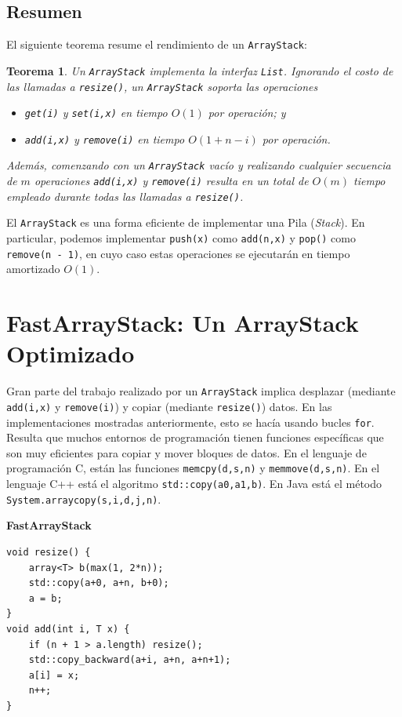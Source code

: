 \documentclass[11pt]{book}
\theoremstyle{plain}
\newtheorem{teorema}{Teorema}[chapter]
\newcommand{\claseheader}[1]{\noindent\textbf{#1}\par\vspace{-4pt}}
\begin{document}
\subsection{Resumen}

El siguiente teorema resume el rendimiento de un \texttt{ArrayStack}:

\begin{teorema}
Un \texttt{ArrayStack} implementa la interfaz \texttt{List}. Ignorando el costo de las llamadas a \texttt{resize()}, un \texttt{ArrayStack} soporta las operaciones

\begin{itemize}
    \item \texttt{get(i)} y \texttt{set(i,x)} en tiempo $O(1)$ por operación; y
    \item \texttt{add(i,x)} y \texttt{remove(i)} en tiempo $O(1 + n - i)$ por operación.
\end{itemize}

Además, comenzando con un \texttt{ArrayStack} vacío y realizando cualquier secuencia de $m$ operaciones \texttt{add(i,x)} y \texttt{remove(i)} resulta en un total de $O(m)$ tiempo empleado durante todas las llamadas a \texttt{resize()}.
\end{teorema}

El \texttt{ArrayStack} es una forma eficiente de implementar una Pila (\emph{Stack}). En particular, podemos implementar \texttt{push(x)} como \texttt{add(n,x)} y \texttt{pop()} como \texttt{remove(n - 1)}, en cuyo caso estas operaciones se ejecutarán en tiempo amortizado $O(1)$.

\section{FastArrayStack: Un ArrayStack Optimizado}

Gran parte del trabajo realizado por un \texttt{ArrayStack} implica desplazar (mediante \texttt{add(i,x)} y \texttt{remove(i)}) y copiar (mediante \texttt{resize()}) datos. En las implementaciones mostradas anteriormente, esto se hacía usando bucles \texttt{for}. Resulta que muchos entornos de programación tienen funciones específicas que son muy eficientes para copiar y mover bloques de datos. En el lenguaje de programación C, están las funciones \texttt{memcpy(d,s,n)} y \texttt{memmove(d,s,n)}. En el lenguaje C++ está el algoritmo \texttt{std::copy(a0,a1,b)}. En Java está el método \texttt{System.arraycopy(s,i,d,j,n)}.

\claseheader{FastArrayStack}
\begin{lstlisting}
void resize() {
    array<T> b(max(1, 2*n));
    std::copy(a+0, a+n, b+0);
    a = b;
}
void add(int i, T x) {
    if (n + 1 > a.length) resize();
    std::copy_backward(a+i, a+n, a+n+1);
    a[i] = x;
    n++;
}
\end{lstlisting}
\end{document}
